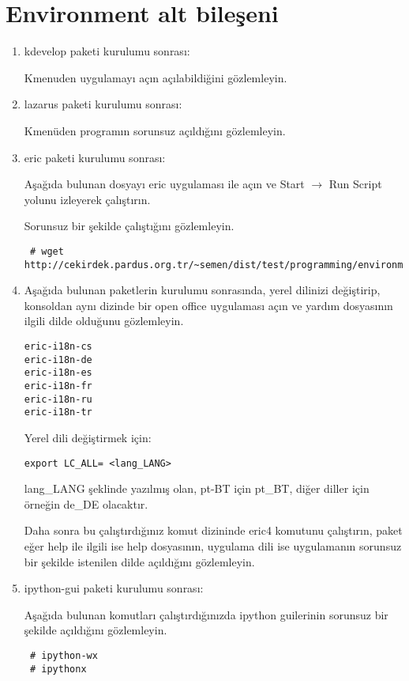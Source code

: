 \documentclass[a4paper,10pt]{article}
\begin{document}
\section{Environment alt bileşeni}
\begin{enumerate}
 \item kdevelop paketi kurulumu sonrası: 

Kmenuden uygulamayı açın açılabildiğini gözlemleyin.

 \item lazarus paketi kurulumu sonrası:

Kmenüden programın sorunsuz açıldığını gözlemleyin.

 \item eric paketi kurulumu sonrası:
 
Aşağıda bulunan dosyayı eric uygulaması ile açın ve Start $\rightarrow$ Run Script yolunu izleyerek çalıştırın. 

Sorunsuz bir şekilde çalıştığını gözlemleyin.
\begin{verbatim}
 # wget http://cekirdek.pardus.org.tr/~semen/dist/test/programming/environment/test.py
\end{verbatim}
 \item Aşağıda bulunan paketlerin kurulumu sonrasında, yerel dilinizi değiştirip, konsoldan aynı dizinde bir open office uygulaması açın ve yardım dosyasının ilgili dilde olduğunu gözlemleyin.
\begin{verbatim}
eric-i18n-cs
eric-i18n-de
eric-i18n-es
eric-i18n-fr
eric-i18n-ru
eric-i18n-tr
 \end{verbatim}

Yerel dili değiştirmek için:
\begin{verbatim}
export LC_ALL= <lang_LANG>
\end{verbatim}

lang\_LANG şeklinde yazılmış olan, pt-BT için pt\_BT, diğer diller için örneğin de\_DE olacaktır.

Daha sonra bu çalıştırdığınız komut dizininde eric4 komutunu çalıştırın, paket eğer help ile ilgili ise help dosyasının, uygulama dili ise uygulamanın sorunsuz bir şekilde istenilen dilde açıldığını gözlemleyin.

\item ipython-gui paketi kurulumu sonrası:

Aşağıda bulunan komutları çalıştırdığınızda ipython guilerinin sorunsuz bir şekilde açıldığını gözlemleyin.
\begin{verbatim}
 # ipython-wx
 # ipythonx
\end{verbatim}



\end{enumerate}
\end{document}
